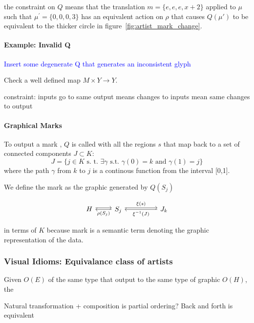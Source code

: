 \documentclass[../main.tex]{subfiles}
\begin{document}
the constraint on $Q$ means that the translation $m=\{e, e, e, x+2\}$ applied to $\mu$ such that $\mu^\prime=\{0,0,0,3\}$ has an equivalent action on $\rho$ that causes $Q(\mu\prime)$ to be equivalent to the thicker circle in figure~\ref{fig:artist_mark_change}.

\paragraph{Example: Invalid Q}
\textcolor{blue}{Insert some degenerate Q that generates an inconsistent glyph}


Check a well defined map $M\times Y \rightarrow Y$.


constraint: inputs go to same output means changes to inputs mean same changes to output

\paragraph{Graphical Marks}
To output a mark  \cite{bertinIIPropertiesGraphic2011,carpendaleVisualRepresentationSemiology}, $Q$ is called with all the regions $s$ that map back to a set of connected components $J \subset K$:
\begin{equation}
J = \{j \in K \text{ s. t. } \exists \gamma \text{ s.t. } \gamma(0)=k \text{ and }\gamma(1)=j\}
\end{equation}
where the path\cite{ConnectedSpace2020}  $\gamma$ from $k$ to $j$ is a continous function from the interval [0,1].

We define the mark as the graphic generated by $Q(S_j)$

\begin{equation}
    \begin{tikzcd}
        H \arrow[r, shift left] & S_j \arrow[rr, "\xi(s)", shift left] \arrow[l, "\rho(S_j)"] &  & J_{k} \arrow[ll, "\xi^{-1}(J)"]
        \end{tikzcd}
    \label{eq:mark}
\end{equation}

in terms of $K$ because mark is a semantic term denoting the graphic representation of the data.

\subsubsection{Visual Idioms: Equivalance class of artists}
Given $O(E)$ of the same type that output to the same type of graphic $O(H)$, the 


Natural transformation + composition is partial ordering? Back and forth is equivalent 
\end{document}
